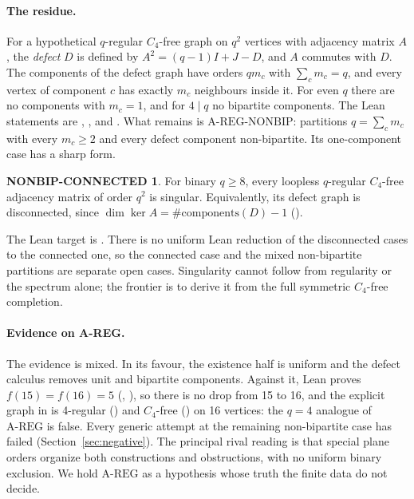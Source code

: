 \documentclass{anvil-paper}
\newcommand{\repobase}{https://github.com/rjwalters/lean-genius/blob/erdos85/integration}
\newcommand{\repofile}[2]{\href{\repobase/#1}{\lean{#2}}}
\newcommand{\AREG}{\mathrm{A\text{-}REG}}
\newcommand{\NONBIP}{\mathrm{A\text{-}REG\text{-}NONBIP}}
\theoremstyle{definition}
\newtheorem*{nonbipconn}{NONBIP-CONNECTED}
\begin{document}
\paragraph{The residue.} For a hypothetical $q$-regular $C_4$-free graph on $q^2$ vertices with adjacency matrix $A$, the \emph{defect} $D$ is defined by $A^2=(q-1)I+J-D$, and $A$ commutes with $D$. The components of the defect graph have orders $qm_c$ with $\sum_c m_c=q$, and every vertex of component $c$ has exactly $m_c$ neighbours inside it. For even $q$ there are no components with $m_c=1$, and for $4\mid q$ no bipartite components. The Lean statements are , ,  and . What remains is $\NONBIP$: partitions $q=\sum_c m_c$ with every $m_c\ge 2$ and every defect component non-bipartite. Its one-component case has a sharp form.

\begin{nonbipconn}
For binary $q\ge 8$, every loopless $q$-regular $C_4$-free adjacency matrix of order $q^2$ is singular. Equivalently, its defect graph is disconnected, since $\dim\ker A=\#\mathrm{components}(D)-1$ ().
\end{nonbipconn}

\noindent The Lean target is . There is no uniform Lean reduction of the disconnected cases to the connected one, so the connected case and the mixed non-bipartite partitions are separate open cases. Singularity cannot follow from regularity or the spectrum alone; the frontier is to derive it from the full symmetric $C_4$-free completion.

\paragraph{Evidence on A-REG.} The evidence is mixed. In its favour, the existence half is uniform and the defect calculus removes unit and bipartite components. Against it, Lean proves $f(15)=f(16)=5$ (, ), so there is no drop from 15 to 16, and the explicit graph  in \repofile{proofs/Proofs/Erdos85Problem.lean}{Erdos85Problem.lean} is 4-regular () and $C_4$-free () on 16 vertices: the $q=4$ analogue of $\AREG$ is false. Every generic attempt at the remaining non-bipartite case has failed (Section~\ref{sec:negative}). The principal rival reading is that special plane orders organize both constructions and obstructions, with no uniform binary exclusion. We hold $\AREG$ as a hypothesis whose truth the finite data do not decide.
\end{document}
